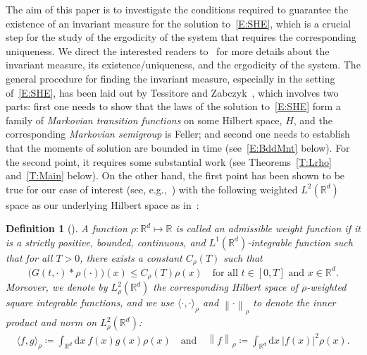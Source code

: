 \documentclass[sn-mathphys]{sn-jnl}%
\renewcommand{\R}{\mathbb{R}}
\newcommand{\Norm}[1]{\left\| #1 \right\|}
\newcommand{\ud}{\ensuremath{\mathrm{d}}}
\numberwithin{equation}{section}
\theoremstyle{thmstyleone}%
\theoremstyle{thmstyletwo}%
\theoremstyle{thmstylethree}%
\newtheorem{definition}{Definition}[section]%
\begin{document}
The aim of this paper is to investigate the conditions required to guarantee the existence of an
invariant measure for the solution to~\eqref{E:SHE}, which is a crucial step for the study of the
ergodicity of the system that requires the corresponding uniqueness. We direct the interested
readers to~\cite{cerrai:01:second,da-prato.zabczyk:96:ergodicity, da-prato.zabczyk:14:stochastic}
for more details about the invariant measure, its existence/uniqueness, and the ergodicity of the
system. The general procedure for finding the invariant measure, especially in the setting
of~\eqref{E:SHE}, has been laid out by Tessitore and Zabczyk~\cite{tessitore.zabczyk:98:invariant},
which involves two parts: first one needs to show that the laws of the solution to~\eqref{E:SHE}
form a family of \emph{Markovian transition functions} on some Hilbert space, $H$, and the
corresponding \emph{Markovian semigroup} is Feller; and second one needs to establish that the
moments of solution are bounded in time (see~\eqref{E:BddMnt} below). For the second point, it
requires some substantial work (see Theorems~\ref{T:Lrho} and~\ref{T:Main} below). On the other
hand, the first point has been shown to be true for our case of interest (see, e.g.,~\cite[Chapter
9]{da-prato.zabczyk:14:stochastic}) with the following weighted $L^2 (\R^d)$ space as our underlying
Hilbert space as in~\cite{tessitore.zabczyk:98:invariant}:

\begin{definition}[\cite{tessitore.zabczyk:98:invariant}]\label{D:Rho}
  A function $\rho:\R^d\mapsto \R$ is called an {\normalfont admissible weight function} if it is a
  strictly positive, bounded, continuous, and $L^1 (\R^d)$-integrable function such that for all
  $T>0$, there exists a constant $C_\rho(T)$ such that
  \begin{equation}\label{E:aw}
    \big(G(t,\cdot)*\rho(\cdot)\big)(x) \le C_\rho(T) \rho(x)
    \quad \text{for all $t\in[0,T]$ and $x\in\R^d$.}
  \end{equation}
  Moreover, we denote by $L^2_{\rho}(\R^d)$ the corresponding Hilbert space of $\rho$-weighted
  square integrable functions, and we use $\langle \cdot, \cdot \rangle_{\rho}$ and
  $\Norm{\cdot}_{\rho}$ to denote the inner product and norm on $L^2_{\rho}(\R^d)$:
  \begin{align*}
  		\langle f,g \rangle_{\rho} \coloneqq \int_{\R^d} \ud x \: f(x) g(x) \rho(x) \quad \text{and} \quad
      \Norm{f}_{\rho} \coloneqq \int_{\R^d} \ud x\: \lvert f(x)\rvert^2 \rho(x).
  \end{align*}
\end{definition}
\end{document}
